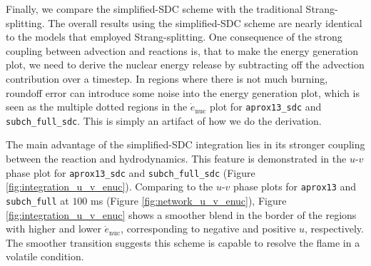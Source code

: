 \documentclass[preprint,times,tighten]{aastex631}
\begin{document}
\begin{figure*}
\centering
{}
\caption{\label{fig:integration_enuc} Slice plots comparing $\dot{e}_{\textrm{nuc}}$ for {\tt aprox13\_sdc} (top panel) and {\tt subch\_full\_sdc} (bottom panel) at $t = 50$ ms.}
\end{figure*}


Finally, we compare the simplified-SDC scheme with the traditional Strang-splitting. The overall results using the simplified-SDC scheme are nearly identical to the models that employed Strang-splitting.
One consequence of the strong coupling between advection and reactions is, that to make the energy generation plot, we need to derive the nuclear energy release by subtracting off the advection contribution over a timestep.  In regions where there is not much burning, roundoff error can introduce some noise into the energy generation plot, which is seen as the multiple dotted regions in the $\dot{e}_{\textrm{nuc}}$ plot for {\tt aprox13\_sdc} and {\tt subch\_full\_sdc}.  This is simply an artifact of how we do
the derivation.


\begin{figure*}
\centering
{}
\caption{\label{fig:integration_u_v_enuc} $u-v$ phase plots for {\tt aprox13\_sdc} (left panel) and {\tt subch\_full\_sdc} (right panel) at $t = 100$ms.}
\end{figure*}


The main advantage of the simplified-SDC integration lies in its stronger coupling between the reaction and hydrodynamics. This feature is demonstrated in the $u$-$v$ phase plot for {\tt aprox13\_sdc} and {\tt subch\_full\_sdc} (Figure \ref{fig:integration_u_v_enuc}). Comparing to the $u$-$v$ phase plots for {\tt aprox13} and {\tt subch\_full} at $100$ ms (Figure \ref{fig:network_u_v_enuc}), Figure \ref{fig:integration_u_v_enuc} shows a smoother blend in the border of the regions with higher and lower $\dot{e}_{\textrm{nuc}}$, corresponding to negative and positive $u$, respectively. The smoother transition suggests this scheme is capable to resolve the flame in a volatile condition. 
\end{document}
